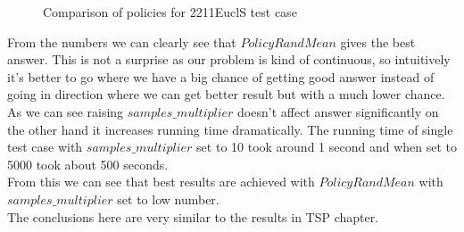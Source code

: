 \begin{figure}[ht]
  
  \caption{Comparison of policies for 2211EuclS test case}
\end{figure}
\FloatBarrier

From the numbers we can clearly see that $PolicyRandMean$ gives the best answer.
This is not a surprise as our problem is kind of continuous, so intuitively it's better
to go where we have a big chance of getting good answer instead of going in direction
where we can get better result but with a much lower chance. \\
As we can see raising $samples\_multiplier$ doesn't affect answer significantly on the other hand
it increases running time dramatically. The running time of single test case with $samples\_multiplier$
set to 10 took around 1 second and when set to 5000 took about 500 seconds. \\
From this we can see that best results are achieved with $PolicyRandMean$ with $samples\_multiplier$ set to low number. \\
The conclusions here are very similar to the results in TSP chapter. 
